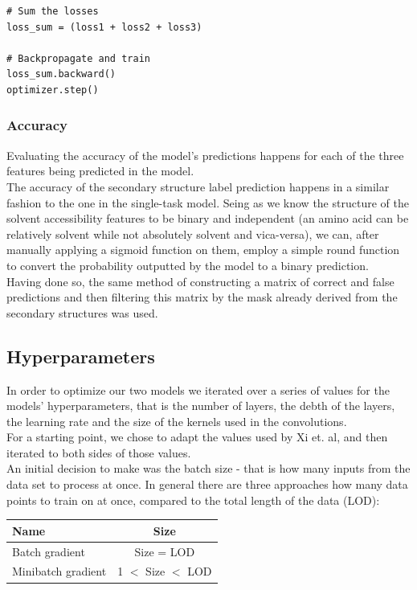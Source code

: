 \begin{multicols}{2}
\begin{lstlisting}
# Sum the losses
loss_sum = (loss1 + loss2 + loss3)

# Backpropagate and train
loss_sum.backward()
optimizer.step()
\end{lstlisting}


\subsubsection{Accuracy}
Evaluating the accuracy of the model's predictions happens for each of the three features being predicted in the model.\\
The accuracy of the secondary structure label prediction happens in a similar fashion to the one in the single-task model. Seing as we know the structure of the solvent accessibility features to be binary and independent (an amino acid can be relatively solvent while not absolutely solvent and vica-versa), we can, after manually applying a sigmoid function on them, employ a simple round function to convert the probability outputted by the model to a binary prediction.\\
Having done so, the same method of constructing a matrix of correct and false predictions and then filtering this matrix by the mask already derived from the secondary structures was used.


\subsection{Hyperparameters}
In order to optimize our two models we iterated over a series of values for the models' hyperparameters, that is the number of layers, the debth of the layers, the learning rate and the size of the kernels used in the convolutions.\\
For a starting point, we chose to adapt the values used by Xi et. al, and then iterated to both sides of those values.\\
An initial decision to make was the batch size - that is how many inputs from the data set to process at once. In general there are three approaches how many data points to train on at once, compared to the total length of the data (LOD):
\begin{center}
\begin{tabular}{l|c}
\hline 
Name & Size \\ 
\hline 
Batch gradient & Size = LOD \\ 

Minibatch gradient & 1 $<$ Size $<$ LOD \\ 


\end{tabular}
\end{center}
\end{multicols}
